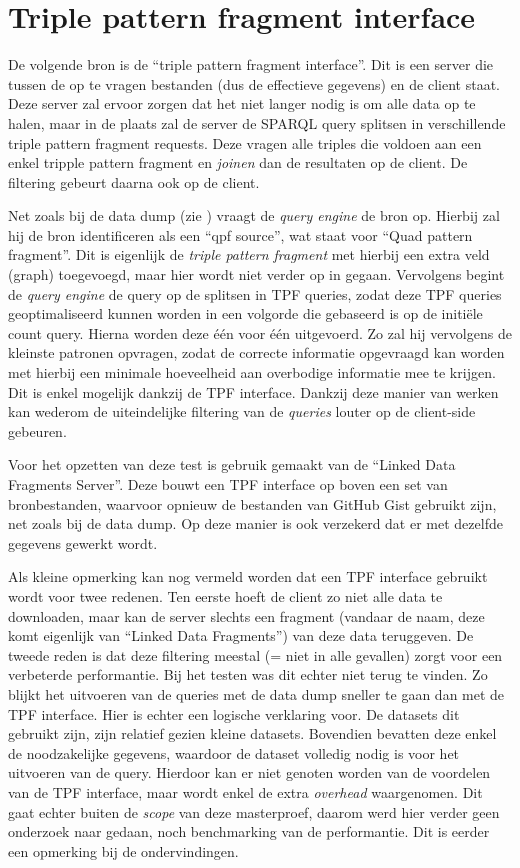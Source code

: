 \section{Triple pattern fragment interface}
\label{sec:impl_tpf_interface}
De volgende bron is de ``triple pattern fragment interface''. Dit is een server die tussen de op te vragen bestanden (dus de effectieve gegevens) en de client staat. Deze server zal ervoor zorgen dat het niet langer nodig is om alle data op te halen, maar in de plaats zal de server de SPARQL query splitsen in verschillende triple pattern fragment requests. Deze vragen alle triples die voldoen aan een enkel tripple pattern fragment en \textit{joinen} dan de resultaten op de client. De filtering gebeurt daarna ook op de client.

Net zoals bij de data dump (zie ) vraagt de \textit{query engine} de bron op. Hierbij zal hij de bron identificeren als een ``qpf source'', wat staat voor ``Quad pattern fragment''. Dit is eigenlijk de \textit{triple pattern fragment} met hierbij een extra veld (graph) toegevoegd, maar hier wordt niet verder op in gegaan. Vervolgens begint de \textit{query engine} de query op de splitsen in TPF queries, zodat deze TPF queries geoptimaliseerd kunnen worden in een volgorde die gebaseerd is op de initiële count query. Hierna worden deze één voor één uitgevoerd. Zo zal hij vervolgens de kleinste patronen opvragen, zodat de correcte informatie opgevraagd kan worden met hierbij een minimale hoeveelheid aan overbodige informatie mee te krijgen. Dit is enkel mogelijk dankzij de TPF interface. Dankzij deze manier van werken kan wederom de uiteindelijke filtering van de \textit{queries} louter op de client-side gebeuren.

Voor het opzetten van deze test is gebruik gemaakt van de ``Linked Data Fragments Server''. Deze bouwt een TPF interface op boven een set van bronbestanden, waarvoor opnieuw de bestanden van GitHub Gist gebruikt zijn, net zoals bij de data dump. Op deze manier is ook verzekerd dat er met dezelfde gegevens gewerkt wordt. 

Als kleine opmerking kan nog vermeld worden dat een TPF interface gebruikt wordt voor twee redenen. Ten eerste hoeft de client zo niet alle data te downloaden, maar kan de server slechts een fragment (vandaar de naam, deze komt eigenlijk van ``Linked Data Fragments'') van deze data teruggeven. De tweede reden is dat deze filtering meestal (= niet in alle gevallen) zorgt voor een verbeterde performantie. Bij het testen was dit echter niet terug te vinden. Zo blijkt het uitvoeren van de queries met de data dump sneller te gaan dan met de TPF interface. Hier is echter een logische verklaring voor. De datasets dit gebruikt zijn, zijn relatief gezien kleine datasets. Bovendien bevatten deze enkel de noodzakelijke gegevens, waardoor de dataset volledig nodig is voor het uitvoeren van de query. Hierdoor kan er niet genoten worden van de voordelen van de TPF interface, maar wordt enkel de extra \textit{overhead} waargenomen. Dit gaat echter buiten de \textit{scope} van deze masterproef, daarom werd hier verder geen onderzoek naar gedaan, noch benchmarking van de performantie. Dit is eerder een opmerking bij de ondervindingen.
